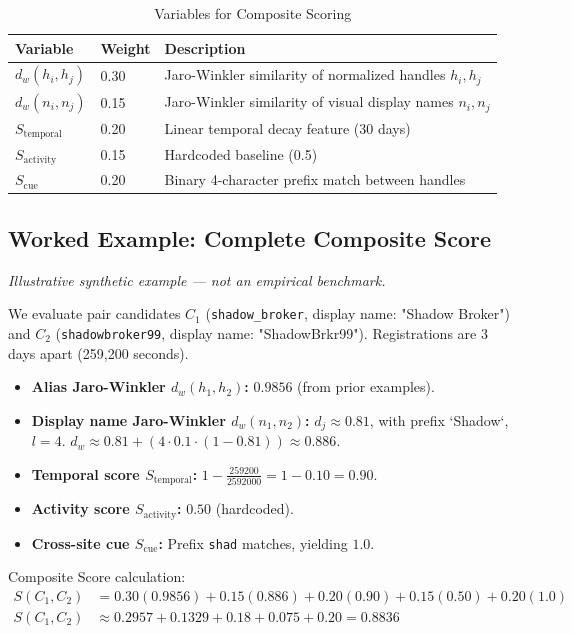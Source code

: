 \begin{table}[h]
\centering
\begin{tabular}{llp{}}
\toprule
\textbf{Variable} & \textbf{Weight} & \textbf{Description} \\
\midrule
$d_w(h_i, h_j)$ & 0.30 & Jaro-Winkler similarity of normalized handles $h_i, h_j$ \\
$d_w(n_i, n_j)$ & 0.15 & Jaro-Winkler similarity of visual display names $n_i, n_j$ \\
$S_{\text{temporal}}$ & 0.20 & Linear temporal decay feature (30 days) \\
$S_{\text{activity}}$ & 0.15 & Hardcoded baseline (0.5) \\
$S_{\text{cue}}$ & 0.20 & Binary 4-character prefix match between handles \\
\bottomrule
\end{tabular}
\caption{Variables for Composite Scoring}
\label{tab:scoring-variables}
\end{table}

\subsection{Worked Example: Complete Composite Score}
\textit{Illustrative synthetic example — not an empirical benchmark.}

We evaluate pair candidates $C_1$ (\texttt{shadow\_broker}, display name: "Shadow Broker") and 
$C_2$ (\texttt{shadowbroker99}, display name: "ShadowBrkr99"). Registrations are 3 days apart 
(259,200 seconds).

\begin{itemize}
\item \textbf{Alias Jaro-Winkler $d_w(h_1, h_2)$:} $0.9856$ (from prior examples).
\item \textbf{Display name Jaro-Winkler $d_w(n_1, n_2)$:} $d_j \approx 0.81$, with prefix `Shadow`, 
$l=4$. $d_w \approx 0.81 + (4 \cdot 0.1 \cdot (1 - 0.81)) \approx 0.886$.
\item \textbf{Temporal score $S_{\text{temporal}}$:} $1 - \frac{259200}{2592000} = 1 - 0.10 = 0.90$.
\item \textbf{Activity score $S_{\text{activity}}$:} $0.50$ (hardcoded).
\item \textbf{Cross-site cue $S_{\text{cue}}$:} Prefix \texttt{shad} matches, yielding $1.0$.
\end{itemize}

Composite Score calculation:
\begin{align}
S(C_1, C_2) &= 0.30(0.9856) + 0.15(0.886) + 0.20(0.90) + 0.15(0.50) + 0.20(1.0) \nonumber \\
S(C_1, C_2) &\approx 0.2957 + 0.1329 + 0.18 + 0.075 + 0.20 = 0.8836 \nonumber
\end{align}

